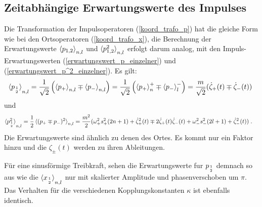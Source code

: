  \subsection{Zeitabhängige Erwartungswerte des Impulses}
    Die Transformation der Impulsoperatoren (\ref{koord_trafo_p}) hat die gleiche Form wie bei den Ortsoperatoren (\ref{koord_trafo_x}), die Berechnung der Erwartungswerte $\braket{p_{1,2}}_{n,l}$ und $\braket{p_{1,2}^2}_{n,l}$ erfolgt darum analog, mit den Impuls-Erwartungswerten (\ref{erwartungswert_p_einzelner}) und (\ref{erwartungswert_p^2_einzelner}).
    Es gilt:
    \begin{align}
      \braket{p_{1 \atop 2}}_{n,l}=\frac{1}{\sqrt{2}}\left(\braket{p_+}_{n,l}\mp\braket{p_-}_{n,l}\right)
      =\frac{1}{\sqrt{2}}\left(\braket{p_+}_n^+\mp\braket{p_-}_l^-\right)
      =\frac{m}{\sqrt{2}}(\dot\zeta_+(t)\mp\dot\zeta_-(t)) \;
    \end{align}
    und
    \begin{align}
      \braket{p^2_{1\atop 2}}_{n,l}&=\frac{1}{2}\braket{(p_+\mp p_-)^2}_{n,l} %
      =\frac {m^2} 2 (\omega_+^2s_+^2(2n+1)+\dot\zeta_+^2(t) \mp 2\dot\zeta_+(t)\dot\zeta_-(t) + \omega_-^2s_-^2(2l+1)+\dot\zeta_-^2(t)) \; .
    \end{align}
    Die Erwartungswerte sind ähnlich zu denen des Ortes.
    Es kommt nur ein Faktor hinzu und die $\zeta_\pm(t)$ werden zu ihren Ableitungen.

    Für eine sinusförmige Treibkraft, sehen die Erwartungswerte fur $p_{1\atop 2}$ demnach so aus wie die $\braket{x_{1\atop 2}}_{n,l}$ nur mit skalierter Amplitude und phasenverschoben um $\pi$.
    Das Verhalten für die verschiedenen Kopplungskonstanten $\kappa$ ist ebenfalls identisch.

